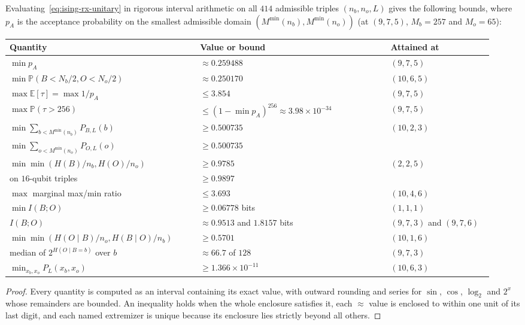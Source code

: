 \documentclass[11pt,a4paper]{article}
\theoremstyle{plain}
\theoremstyle{definition}
\theoremstyle{remark}
\newcommand{\Prob}{\mathbb{P}}
\newcommand{\Exp}{\mathbb{E}}
\begin{document}
\begin{proposition}\label{prop:certificate}
  Evaluating~\eqref{eq:ising-rx-unitary} in rigorous interval arithmetic on all \( 414 \)
  admissible triples \( (n_b, n_o, L) \) gives the following bounds, where \( p_A \) is the
  acceptance probability on the smallest admissible domain \( (M^{\min}(n_b), M^{\min}(n_o)) \)
  (at \( (9, 7, 5) \), \( M_b = 257 \) and \( M_o = 65 \)):
  \begin{center}
    \small\upshape
    \begin{tabular}{@{}p{0.37\linewidth}p{0.37\linewidth}p{0.2\linewidth}@{}}
      \toprule
      Quantity & Value or bound & Attained at \\
      \midrule
      \( \min p_A \) & \( \approx 0.259488 \) & \( (9, 7, 5) \) \\
      \( \min \Prob(B < N_b / 2, O < N_o / 2) \) & \( \approx 0.250170 \) & \( (10, 6, 5) \) \\
      \( \max \Exp[\tau] = \max 1 / p_A \) & \( \le 3.854 \) & \( (9, 7, 5) \) \\
      \( \max \Prob(\tau > 256) \) & \( \le {(1 - \min p_A)}^{256} \approx 3.98 \times 10^{-34} \) & \( (9, 7, 5) \) \\
      \midrule
      \( \min \sum_{b < M^{\min}(n_b)} P_{B,L}(b) \) & \( \ge 0.500735 \) & \( (10, 2, 3) \) \\
      \( \min \sum_{o < M^{\min}(n_o)} P_{O,L}(o) \) & \( \ge 0.500735 \) & \\
      \( \min \min(H(B) / n_b, H(O) / n_o) \) & \( \ge 0.9785 \) & \( (2, 2, 5) \) \\
      \quad on \( 16 \)-qubit triples & \( \ge 0.9897 \) & \\
      \( \max \) marginal max/min ratio & \( \le 3.693 \) & \( (10, 4, 6) \) \\
      \midrule
      \( \min I(B; O) \) & \( \ge 0.06778 \) bits & \( (1, 1, 1) \) \\
      \( I(B; O) \) & \( \approx 0.9513 \) and \( 1.8157 \) bits & \( (9, 7, 3) \) and \( (9, 7, 6) \) \\
      \( \min \min(H(O \mid B) / n_o, H(B \mid O) / n_b) \) & \( \ge 0.5701 \) & \( (10, 1, 6) \) \\
      median of \( 2^{H(O \mid B = b)} \) over \( b \) & \( \approx 66.7 \) of \( 128 \) & \( (9, 7, 3) \) \\
      \midrule
      \( \min_{x_b, x_o} P_L(x_b, x_o) \) & \( \ge 1.366 \times 10^{-11} \) & \( (10, 6, 3) \) \\
      \bottomrule
    \end{tabular}
  \end{center}
\end{proposition}
\begin{proof}
  Every quantity is computed as an interval containing its exact value, with outward rounding
  and series for \( \sin \), \( \cos \), \( \log_2 \) and \( 2^x \) whose remainders are
  bounded. An inequality holds when the whole enclosure satisfies it, each \( \approx \) value is
  enclosed to within one unit of its last digit, and each named extremizer is unique because its
  enclosure lies strictly beyond all others.
\end{proof}
\end{document}
